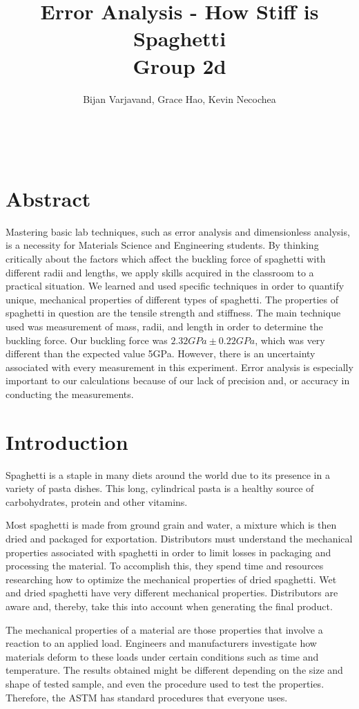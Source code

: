 \documentclass[12pt]{article}
\author{Bijan Varjavand, Grace Hao, Kevin Necochea}
\title{Error Analysis - How Stiff is Spaghetti\\Group 2d}
\renewcommand{\baselinestretch}{1.5}
\begin{document}
\maketitle
\ \\[0.2in]
\renewcommand{\baselinestretch}{1.0}
\section{Abstract}
\centering
Mastering basic lab techniques, such as error analysis and dimensionless analysis, is a necessity for Materials Science and Engineering students. By thinking critically about the factors which affect the buckling force of spaghetti with different radii and lengths, we apply skills acquired in the classroom to a practical situation. We learned and used specific techniques in order to quantify unique, mechanical properties of different types of spaghetti. The properties of spaghetti in question are the tensile strength and stiffness. The main technique used was measurement of mass, radii, and length in order to determine the buckling force. Our buckling force was $2.32 GPa \pm 0.22 GPa$, which was very different than the expected value 5GPa. However, there is an uncertainty associated with every measurement in this experiment. Error analysis is especially important to our calculations because of our lack of precision and, or accuracy in conducting the measurements.

\clearpage

\raggedright
\linespread{1.6}
\renewcommand{\baselinestretch}{1.5}
\section{Introduction}
Spaghetti is a staple in many diets around the world due to its presence in a variety of pasta dishes. This long, cylindrical pasta is a healthy source of carbohydrates, protein and other vitamins.

Most spaghetti is made from ground grain and water, a mixture which is then dried and packaged for exportation. Distributors must understand the mechanical properties associated with spaghetti in order to limit losses in packaging and processing the material. To accomplish this, they spend time and resources researching how to optimize the mechanical properties of dried spaghetti. Wet and dried spaghetti have very different mechanical properties. Distributors are aware and, thereby, take this into account when generating the final product.

The mechanical properties of a material are those properties that involve a reaction to an applied load. Engineers and manufacturers investigate how materials deform to these loads under certain conditions such as time and temperature. The results obtained might be different depending on the size and shape of tested sample, and even the procedure used to test the properties. Therefore, the ASTM has standard procedures that everyone uses.
\end{document}
